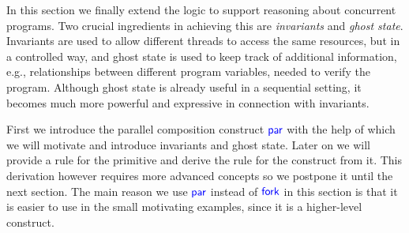 \newcommand{\ownoprule}[1][]
{\rulegen[#1]{Own-op}
  { }
  {\ownGhost{\gamma}{a : \Ml_i} \ast \ownGhost{\gamma}{b : \Ml_i} \provesIff \ownGhost{\gamma}{a \cdot b : \Ml_i}}}
\newcommand{\ownvalidrule}[1][]
{\rulegen[#1]{Own-valid}
  { }
  {\ownGhost{\gamma}{a : \Ml_i} \proves a \in \Vl_i}}
\newcommand{\perscorerule}[1][]
{\rulegen[#1]{Persistently-core}
  {\Gamma \proves \wtt{a}{\Ml_i} \and \mcore{a}_i \text{ defined } }
  {\ownGhost{\gamma}{a : \Ml_i} \proves \persistently \ownGhost{\gamma}{\mcore{a}_i : \Ml_i}}}

\newcommand{\fpurule}[1][]
  {\rulegen[#1]{frame-preserving-update}
    {}{a \mupd B \iff \forall x \in \Ml, a \cdot x \in \Vl \implies \exists b \in B, b \cdot x \in \Vl.}}

\newcommand{\ghostallocrule}[1][]
{\rulegen[#1]{Ghost-alloc}
  {a \in \Vl}
  {\TRUE \proves \pvs \Exists \gamma . \ownGhost{\gamma}{a}}}
\newcommand{\ghostupdaterule}[1][]
{\rulegen[#1]{Ghost-update}
  {a \mupd b}
  { \ownGhost{\gamma}{a} \proves \pvs \ownGhost{\gamma}{b}}}
\newcommand{\htcsqvsrule}[1][]{\htcsqgen[-vs#1]{-vs}{\vs}{}}

\newcommand{\updseprule}[1][]
{\rulegen[#1]{upd-sep}{P_1 \proves \pvs Q_1 \and P_2 \proves \pvs Q_2}
  {P_1 \ast P_2 \proves \pvs (Q_1 \ast Q_2)}}
\newcommand{\updbindrule}[1][]
{\rulegen[#1]{upd-bind}{P_2 \proves \pvs Q \and P_1 \ast Q \proves \pvs R} {P_1 \ast P_2 \proves \pvs R}}

\newcommand{\htinvallocpostrule}[1][]
{\rulegen[#1]
    {Ht-inv-alloc-post}
    {\mathcal{E}\ \infinite \and S \proves \hoare{P_2}{e}{v.Q}[\mathcal{E}]}
    {S \proves \hoare{\left(\later P_1\right) \ast P_2}{e}{v.Q \land \Exists \iota \in \mathcal{E}.\knowInv{\iota}{P_1}}[\mathcal{E}]}}

In this section we finally extend the logic to support reasoning about concurrent programs.
Two crucial ingredients in achieving this are \emph{invariants} and \emph{ghost state}.
Invariants are used to allow different threads to access the same resources, but in a controlled way, and ghost state is used to keep track of additional information, e.g., relationships between different program variables, needed to verify the program.
Although ghost state is already useful in a sequential setting, it becomes much more powerful and expressive in connection with invariants.

First we introduce the parallel composition construct $\textsf{\color{blue} par}$ with the help of which we will motivate and introduce invariants and ghost state.
Later on we will provide a rule for the  primitive and derive the rule for the  construct from it.
This derivation however requires more advanced concepts so we postpone it until the next section.
The main reason we use $\textsf{\color{blue} par}$ instead of $\textsf{\color{blue} fork}$ in this section is that it is easier to use in the small motivating examples, since it is a higher-level construct.
